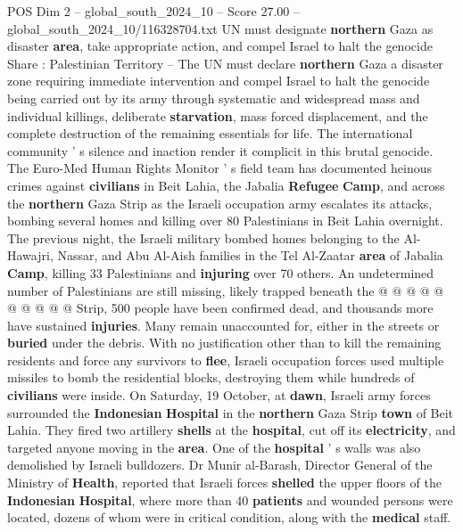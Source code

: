 \begin{textsample}{POS Dim 2 – global\_south\_2024\_10 – Score 27.00 – global\_south\_2024\_10/116328704.txt}  \label{ex:f2_pos_137}
UN must designate \textbf{northern} Gaza as disaster \textbf{area}, take appropriate action, and compel Israel to halt the genocide Share : Palestinian Territory -- The UN must declare \textbf{northern} Gaza a disaster zone requiring immediate intervention and compel Israel to halt the genocide being carried out by its army through systematic and widespread mass and individual killings, deliberate \textbf{starvation}, mass forced displacement, and the complete destruction of the remaining essentials for life.
The international community ' s silence and inaction render it complicit in this brutal genocide.
The Euro-Med Human Rights Monitor ' s field team has documented heinous crimes against \textbf{civilians} in Beit Lahia, the Jabalia \textbf{Refugee} \textbf{Camp}, and across the \textbf{northern} Gaza Strip as the Israeli occupation army escalates its attacks, bombing several homes and killing over 80 Palestinians in Beit Lahia overnight.
The previous night, the Israeli military bombed homes belonging to the Al-Hawajri, Nassar, and Abu Al-Aish families in the Tel Al-Zaatar \textbf{area} of Jabalia \textbf{Camp}, killing 33 Palestinians and \textbf{injuring} over 70 others.
An undetermined number of Palestinians are still missing, likely trapped beneath the @ @ @ @ @ @ @ @ @ @ Strip, 500 people have been confirmed dead, and thousands more have sustained \textbf{injuries}.
Many remain unaccounted for, either in the streets or \textbf{buried} under the debris.
With no justification other than to kill the remaining residents and force any survivors to \textbf{flee}, Israeli occupation forces used multiple missiles to bomb the residential blocks, destroying them while hundreds of \textbf{civilians} were inside.
On Saturday, 19 October, at \textbf{dawn}, Israeli army forces surrounded the \textbf{Indonesian} \textbf{Hospital} in the \textbf{northern} Gaza Strip \textbf{town} of Beit Lahia.
They fired two artillery \textbf{shells} at the \textbf{hospital}, cut off its \textbf{electricity}, and targeted anyone moving in the \textbf{area}.
One of the \textbf{hospital} ' s walls was also demolished by Israeli bulldozers.
Dr Munir al-Barash, Director General of the Ministry of \textbf{Health}, reported that Israeli forces \textbf{shelled} the upper floors of the \textbf{Indonesian} \textbf{Hospital}, where more than 40 \textbf{patients} and wounded persons were located, dozens of whom were in critical condition, along with the \textbf{medical} staff.

\end{textsample}
